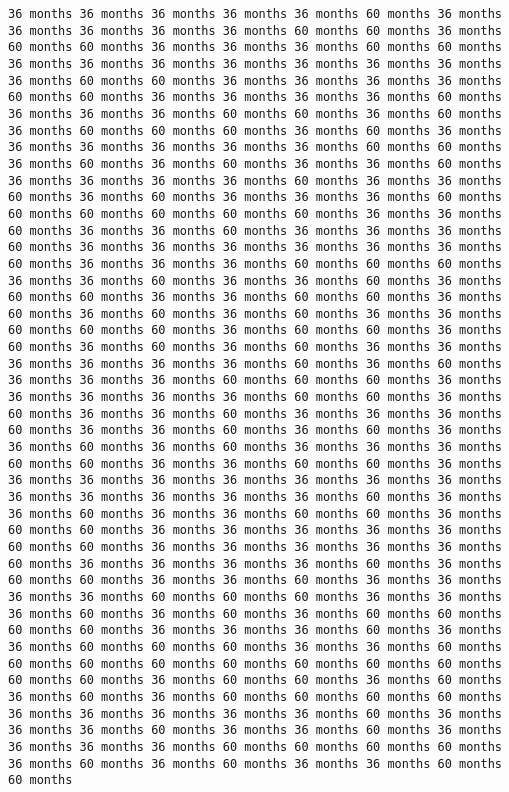 \documentclass[11pt]{article}
\begin{document}
\begin{Verbatim}[commandchars=\\\{\}, frame=single, framerule=2mm, rulecolor=\color{outerrorbackground}]
36 months 36 months 36 months 36 months 36 months 60 months 36 months 36 months 36 months 36 months 36 months 60 months 60 months 36 months 60 months 60 months 36 months 36 months 36 months 60 months 60 months 36 months 36 months 36 months 36 months 36 months 36 months 36 months 36 months 60 months 60 months 36 months 36 months 36 months 36 months 60 months 60 months 36 months 36 months 36 months 36 months 60 months 36 months 36 months 36 months 60 months 60 months 36 months 60 months 36 months 60 months 60 months 60 months 36 months 60 months 36 months 36 months 36 months 36 months 36 months 36 months 60 months 60 months 36 months 60 months 36 months 60 months 36 months 36 months 60 months 36 months 36 months 36 months 36 months 60 months 36 months 36 months 60 months 36 months 60 months 36 months 36 months 36 months 60 months 60 months 60 months 60 months 60 months 60 months 36 months 36 months 60 months 36 months 36 months 60 months 36 months 36 months 36 months 60 months 36 months 36 months 36 months 36 months 36 months 36 months 60 months 36 months 36 months 36 months 60 months 60 months 60 months 36 months 36 months 60 months 36 months 36 months 60 months 36 months 60 months 60 months 36 months 36 months 60 months 60 months 36 months 60 months 36 months 60 months 36 months 60 months 36 months 36 months 60 months 60 months 60 months 36 months 60 months 60 months 36 months 60 months 36 months 60 months 36 months 60 months 36 months 36 months 36 months 36 months 36 months 36 months 60 months 36 months 60 months 36 months 36 months 36 months 60 months 60 months 60 months 36 months 36 months 36 months 36 months 36 months 60 months 60 months 36 months 60 months 36 months 36 months 60 months 36 months 36 months 36 months 60 months 36 months 36 months 60 months 36 months 60 months 36 months 36 months 60 months 36 months 60 months 36 months 36 months 36 months 60 months 60 months 36 months 36 months 60 months 60 months 36 months 36 months 36 months 36 months 36 months 36 months 36 months 36 months 36 months 36 months 36 months 36 months 36 months 60 months 36 months 36 months 60 months 36 months 36 months 60 months 60 months 36 months 60 months 60 months 36 months 36 months 36 months 36 months 36 months 60 months 60 months 36 months 36 months 36 months 36 months 36 months 60 months 36 months 36 months 36 months 36 months 60 months 36 months 60 months 60 months 36 months 36 months 60 months 36 months 36 months 36 months 36 months 60 months 60 months 60 months 36 months 36 months 36 months 60 months 36 months 60 months 36 months 60 months 60 months 60 months 60 months 36 months 36 months 36 months 60 months 36 months 36 months 60 months 60 months 60 months 36 months 36 months 60 months 60 months 60 months 60 months 60 months 60 months 60 months 60 months 60 months 60 months 36 months 60 months 60 months 36 months 60 months 36 months 60 months 36 months 60 months 60 months 60 months 60 months 36 months 36 months 36 months 36 months 36 months 60 months 36 months 36 months 36 months 60 months 36 months 36 months 60 months 36 months 36 months 36 months 36 months 60 months 60 months 60 months 60 months 36 months 60 months 36 months 60 months 36 months 36 months 60 months 60 months 
\end{Verbatim}
\end{document}
